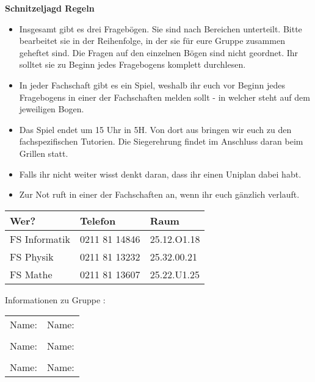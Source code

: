 \documentclass[a4paper,10pt]{article}
\newcommand{\titel}[2]{
\begin{center}
{\Huge \textbf{#1}}\vspace{\baselineskip}\\
{\LARGE #2}
\vspace{\baselineskip}
\end{center}
}
\begin{document}
\titel{Schnitzeljagd Regeln}{}
\large
\begin{itemize}
 \item Insgesamt gibt es drei Fragebögen. Sie sind nach Bereichen unterteilt. Bitte bearbeitet sie in der Reihenfolge, in der sie für eure Gruppe zusammen geheftet sind. Die Fragen auf den einzelnen Bögen sind nicht geordnet. Ihr solltet sie zu Beginn jedes Fragebogens komplett durchlesen.
 \item In jeder Fachschaft gibt es ein Spiel, weshalb ihr euch vor Beginn jedes Fragebogens in einer der Fachschaften melden sollt - in welcher steht auf dem jeweiligen Bogen.
 \item Das Spiel endet um 15 Uhr in 5H. Von dort aus bringen wir euch zu den fachspezifischen Tutorien. Die Siegerehrung findet im Anschluss daran beim Grillen statt.
 \item Falls ihr nicht weiter wisst denkt daran, dass ihr einen Uniplan dabei habt.
 \item Zur Not ruft in einer der Fachschaften an, wenn ihr euch gänzlich verlauft.
\end{itemize}
\begin{center}
\begin{tabular}{|l|l|l|}
 \hline
 Wer? & Telefon & Raum \\
\hline \hline
 FS Informatik & 0211 81 14846 & 25.12.O1.18 \\ \hline
 FS Physik & 0211 81 13232 & 25.32.00.21 \\ \hline
 FS Mathe & 0211 81 13607 & 25.22.U1.25 \\ \hline
\end{tabular}
\end{center}
\vspace{2cm}
\begin{center}
\Huge Informationen zu Gruppe \underline{\hspace{2cm}}:\\
\end{center}
\begin{tabular}{ll}
 Name: \underline{\hspace{0.4\textwidth}} & Name: \underline{\hspace{0.4\textwidth}} \\
 & \\
 Name: \underline{\hspace{0.4\textwidth}} & Name: \underline{\hspace{0.4\textwidth}} \\
 & \\
 Name: \underline{\hspace{0.4\textwidth}} & Name: \underline{\hspace{0.4\textwidth}} \\
\end{tabular}
\end{document}
